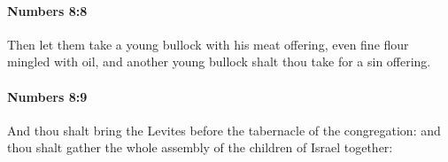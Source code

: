 		\paragraph{Numbers 8:8} %
			\label{NUMBERS-8-8}

			Then let them take a young bullock with his meat offering, even fine flour mingled with oil, and another young bullock shalt thou take for a sin offering.


		\paragraph{Numbers 8:9} %
			\label{NUMBERS-8-9}

			And thou shalt bring the Levites before the tabernacle of the congregation: and thou shalt gather the whole assembly of the children of Israel together:



